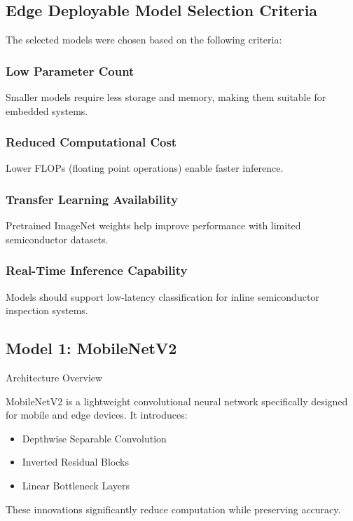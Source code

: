 \subsection{Edge Deployable Model Selection Criteria}
The selected models were chosen based on the following criteria:

\subsubsection{Low Parameter Count}

Smaller models require less storage and memory, making them suitable for embedded systems.

\subsubsection{Reduced Computational Cost}

Lower FLOPs (floating point operations) enable faster inference.

\subsubsection{Transfer Learning Availability}

Pretrained ImageNet weights help improve performance with limited semiconductor datasets.

\subsubsection{Real-Time Inference Capability}

Models should support low-latency classification for inline semiconductor inspection systems.

\subsection{Model 1: MobileNetV2}
Architecture Overview

MobileNetV2 is a lightweight convolutional neural network specifically designed for mobile and edge devices. It introduces:
\begin{itemize}
   \item Depthwise Separable Convolution
   \item Inverted Residual Blocks
   \item Linear Bottleneck Layers
\end{itemize}
These innovations significantly reduce computation while preserving accuracy.

